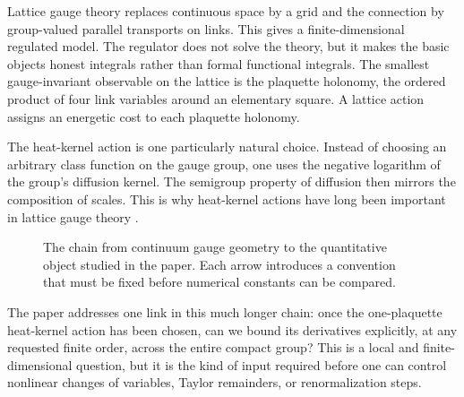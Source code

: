 \documentclass[11pt]{article}
\theoremstyle{definition}
\newcommand{\SU}{\mathrm{SU}(2)}
\begin{document}
Lattice gauge theory replaces continuous space by a grid and the connection
by group-valued parallel transports on links.  This gives a finite-dimensional
regulated model.  The regulator does not solve the theory, but it makes the
basic objects honest integrals rather than formal functional integrals.
The smallest gauge-invariant observable on the lattice is the plaquette
holonomy, the ordered product of four link variables around an elementary
square.  A lattice action assigns an energetic cost to each plaquette
holonomy.

The heat-kernel action is one particularly natural choice.  Instead of
choosing an arbitrary class function on the gauge group, one uses the
negative logarithm of the group's diffusion kernel.  The semigroup property
of diffusion then mirrors the composition of scales.  This is why heat-kernel
actions have long been important in lattice gauge theory
\cite{MenottiOnofri1981,Manton1980,BitarDukeJadid1985}.

\begin{figure}[ht]
\centering
{}
\caption{The chain from continuum gauge geometry to the quantitative object
studied in the paper.  Each arrow introduces a convention that must be fixed
before numerical constants can be compared.}
\label{expl:fig:chain}
\end{figure}

The paper addresses one link in this much longer chain: once the one-plaquette
heat-kernel action has been chosen, can we bound its derivatives explicitly,
at any requested finite order, across the entire compact group?  This is a
local and finite-dimensional question, but it is the kind of input required
before one can control nonlinear changes of variables, Taylor remainders, or
renormalization steps.
\end{document}
